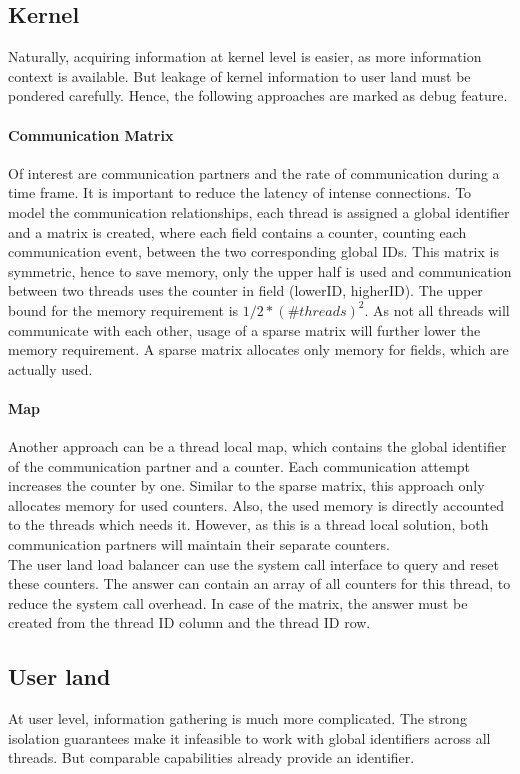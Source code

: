 \subsection{Kernel}
Naturally, acquiring information at kernel level is easier, as more information
context is available.
But leakage of kernel information to user land must be pondered carefully.
Hence, the following approaches are marked as debug feature.


\paragraph{Communication Matrix}
Of interest are communication partners and the rate of communication during a
time frame.
It is important to reduce the latency of intense connections.
To model the communication relationships, each thread is assigned a global
identifier and a matrix is created, where each field contains a counter,
counting each communication event, between the two corresponding global IDs.
This matrix is symmetric, hence to save memory, only the upper half is used
and communication between two threads uses the counter in field
(lowerID, higherID).
The upper bound for the memory requirement is $1/2 * (\#threads)^2$.
As not all threads will communicate with each other, usage of a sparse matrix
will further lower the memory requirement.
A sparse matrix allocates only memory for fields, which are actually used.

\paragraph{Map}
Another approach can be a thread local map, which contains the global
identifier of the communication partner and a counter.
Each communication attempt increases the counter by one.
Similar to the sparse matrix, this approach only allocates memory for used
counters.
Also, the used memory is directly accounted to the threads which needs it.
However, as this is a thread local solution, both communication partners will
maintain their separate counters.
\\

The user land load balancer can use the system call interface to query
and reset these counters.
The answer can contain an array of all counters for this thread, to reduce the
system call overhead.
In case of the matrix, the answer must be created from the thread ID column and
the thread ID row.


\subsection{User land}
At user level, information gathering is much more complicated.
The strong isolation guarantees make it infeasible to work with global
identifiers across all threads.
But comparable capabilities already provide an identifier.

